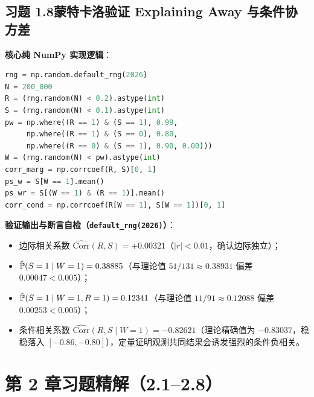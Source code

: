 \subsection*{习题 1.8\quad 蒙特卡洛验证 Explaining Away 与条件协方差}
\textbf{核心纯 NumPy 实现逻辑}：
\begin{lstlisting}[language=Python]
rng = np.random.default_rng(2026)
N = 200_000
R = (rng.random(N) < 0.2).astype(int)
S = (rng.random(N) < 0.1).astype(int)
pw = np.where((R == 1) & (S == 1), 0.99,
     np.where((R == 1) & (S == 0), 0.80,
     np.where((R == 0) & (S == 1), 0.90, 0.00)))
W = (rng.random(N) < pw).astype(int)
corr_marg = np.corrcoef(R, S)[0, 1]
ps_w = S[W == 1].mean()
ps_wr = S[(W == 1) & (R == 1)].mean()
corr_cond = np.corrcoef(R[W == 1], S[W == 1])[0, 1]
\end{lstlisting}
\textbf{验证输出与断言自检（\texttt{default\_rng(2026)}）}：
\begin{itemize}
  \item 边际相关系数 $\widehat{\mathrm{Corr}}(R, S) = +0.00321$（$|r| < 0.01$，确认边际独立）；
  \item $\hat{\mathbb{P}}(S=1 \mid W=1) = 0.38885$（与理论值 $51/131 \approx 0.38931$ 偏差 $0.00047 < 0.005$）；
  \item $\hat{\mathbb{P}}(S=1 \mid W=1, R=1) = 0.12341$（与理论值 $11/91 \approx 0.12088$ 偏差 $0.00253 < 0.005$）；
  \item 条件相关系数 $\widehat{\mathrm{Corr}}(R, S \mid W=1) = -0.82621$（理论精确值为 $-0.83037$，稳稳落入 $[-0.86, -0.80]$），定量证明观测共同结果会诱发强烈的条件负相关。
\end{itemize}

\section{第 2 章习题精解（2.1--2.8）}

